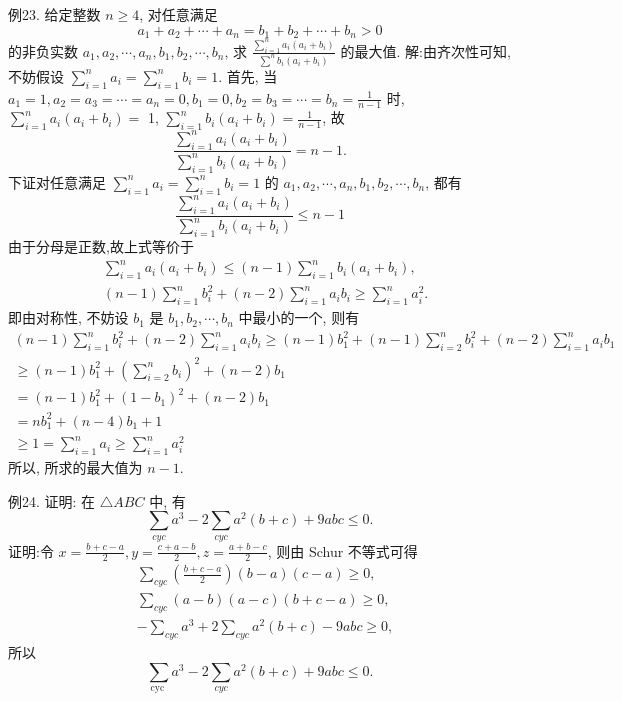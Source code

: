 例23. 给定整数 $n \geqslant 4$, 对任意满足
$$
a_1+a_2+\cdots+a_n=b_1+b_2+\cdots+b_n>0
$$
的非负实数 $a_1, a_2, \cdots, a_n, b_1, b_2, \cdots, b_n$, 求 $\frac{\sum_{i=1}^n a_i\left(a_i+b_i\right)}{\sum^n b_i\left(a_i+b_i\right)}$ 的最大值.
解:由齐次性可知, 不妨假设 $\sum_{i=1}^n a_i=\sum_{i=1}^n b_i=1$. 首先, 当 $a_1=1, a_2= a_3=\cdots=a_n=0, b_1=0, b_2=b_3=\cdots=b_n=\frac{1}{n-1}$ 时, $\sum_{i=1}^n a_i\left(a_i+b_i\right)=$ 1, $\sum_{i=1}^n b_i\left(a_i+b_i\right)=\frac{1}{n-1}$, 故
$$
\frac{\sum_{i=1}^n a_i\left(a_i+b_i\right)}{\sum_{i=1}^n b_i\left(a_i+b_i\right)}=n-1 .
$$
下证对任意满足 $\sum_{i=1}^n a_i=\sum_{i=1}^n b_i=1$ 的 $a_1, a_2, \cdots, a_n, b_1, b_2, \cdots, b_n$, 都有
$$
\frac{\sum_{i=1}^n a_i\left(a_i+b_i\right)}{\sum_{i=1}^n b_i\left(a_i+b_i\right)} \leqslant n-1
$$
由于分母是正数,故上式等价于
$$
\begin{aligned}
& \sum_{i=1}^n a_i\left(a_i+b_i\right) \leqslant(n-1) \sum_{i=1}^n b_i\left(a_i+b_i\right), \\
& (n-1) \sum_{i=1}^n b_i^2+(n-2) \sum_{i=1}^n a_i b_i \geqslant \sum_{i=1}^n a_i^2 .
\end{aligned}
$$
即由对称性, 不妨设 $b_1$ 是 $b_1, b_2, \cdots, b_n$ 中最小的一个, 则有
$$
\begin{aligned}
(n-1) \sum_{i=1}^n b_i^2+(n-2) \sum_{i=1}^n a_i b_i \geqslant(n-1) b_1^2+(n-1) \sum_{i=2}^n b_i^2+(n-2) \sum_{i=1}^n a_i b_1 \\
\geqslant(n-1) b_1^2+\left(\sum_{i=2}^n b_i\right)^2+(n-2) b_1 \\
=(n-1) b_1^2+\left(1-b_1\right)^2+(n-2) b_1 \\
=n b_1^2+(n-4) b_1+1 \\
\geqslant 1=\sum_{i=1}^n a_i \geqslant \sum_{i=1}^n a_i^2
\end{aligned}
$$
所以, 所求的最大值为 $n-1$.



例24. 证明: 在 $\triangle A B C$ 中, 有
$$
\sum_{c y c} a^3-2 \sum_{c y c} a^2(b+c)+9 a b c \leqslant 0 .
$$
证明:令 $x=\frac{b+c-a}{2}, y=\frac{c+a-b}{2}, z=\frac{a+b-c}{2}$, 则由 Schur 不等式可得
$$
\begin{aligned}
& \sum_{c y c}\left(\frac{b+c-a}{2}\right)(b-a)(c-a) \geqslant 0, \\
& \sum_{c y c}(a-b)(a-c)(b+c-a) \geqslant 0, \\
& -\sum_{c y c} a^3+2 \sum_{c y c} a^2(b+c)-9 a b c \geqslant 0,
\end{aligned}
$$
所以
$$
\sum_{\text {cyc }} a^3-2 \sum_{c y c} a^2(b+c)+9 a b c \leqslant 0 .
$$



